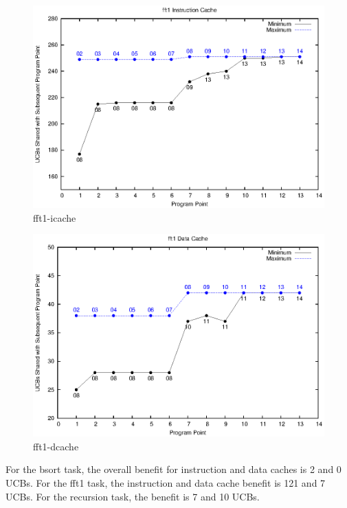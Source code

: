 \begin{figure}[h]
\begin{center}
    \includegraphics[scale = .65, clip]{eps/fft1-icache.eps}
\caption{fft1-icache}\label{fig:fft1-icache}
\end{center}
\end{figure}

\begin{figure}[h]
\begin{center}
    \includegraphics[scale = .65, clip]{eps/fft1-dcache.eps}
\caption{fft1-dcache}\label{fig:fft1-dcache}
\end{center}
\end{figure}

For the bsort task, the overall benefit for instruction and data
caches is 2 and 0 UCBs. For the fft1 task, the instruction and data
cache benefit is 121 and 7 UCBs. For the recursion task, the benefit
is 7 and 10 UCBs.

